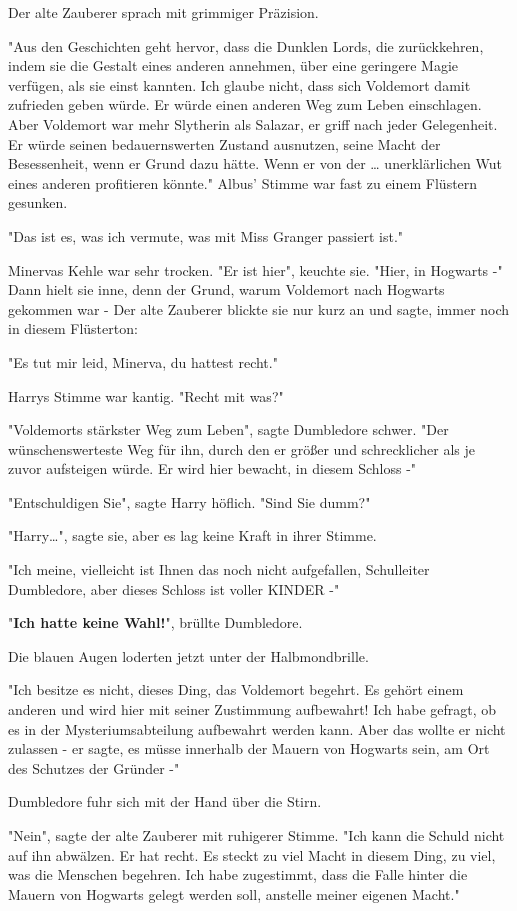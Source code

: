 {Der alte Zauberer sprach mit grimmiger Präzision.

"Aus den Geschichten geht hervor, dass die Dunklen Lords, die zurückkehren, indem sie die Gestalt eines anderen annehmen, über eine geringere Magie verfügen, als sie einst kannten. Ich glaube nicht, dass sich Voldemort damit zufrieden geben würde. Er würde einen anderen Weg zum Leben einschlagen. Aber Voldemort war mehr Slytherin als Salazar, er griff nach jeder Gelegenheit. Er würde seinen bedauernswerten Zustand ausnutzen, seine Macht der Besessenheit, wenn er Grund dazu hätte. Wenn er von der … unerklärlichen Wut eines anderen profitieren könnte." Albus' Stimme war fast zu einem Flüstern gesunken.

"Das ist es, was ich vermute, was mit Miss Granger passiert ist."

Minervas Kehle war sehr trocken. "Er ist hier", keuchte sie. "Hier, in Hogwarts -" Dann hielt sie inne, denn der Grund, warum Voldemort nach Hogwarts gekommen war - Der alte Zauberer blickte sie nur kurz an und sagte, immer noch in diesem Flüsterton:

"Es tut mir leid, Minerva, du hattest recht."

Harrys Stimme war kantig. "Recht mit was?"

"Voldemorts stärkster Weg zum Leben", sagte Dumbledore schwer. "Der wünschenswerteste Weg für ihn, durch den er größer und schrecklicher als je zuvor aufsteigen würde. Er wird hier bewacht, in diesem Schloss -"

"Entschuldigen Sie", sagte Harry höflich. "Sind Sie dumm?"

"Harry…", sagte sie, aber es lag keine Kraft in ihrer Stimme.

"Ich meine, vielleicht ist Ihnen das noch nicht aufgefallen, Schulleiter Dumbledore, aber dieses Schloss ist voller KINDER -"

"\textbf{Ich hatte keine Wahl!}", brüllte Dumbledore.

Die blauen Augen loderten jetzt unter der Halbmondbrille.

"Ich besitze es nicht, dieses Ding, das Voldemort begehrt. Es gehört einem anderen und wird hier mit seiner Zustimmung aufbewahrt! Ich habe gefragt, ob es in der Mysteriumsabteilung aufbewahrt werden kann. Aber das wollte er nicht zulassen - er sagte, es müsse innerhalb der Mauern von Hogwarts sein, am Ort des Schutzes der Gründer -"

Dumbledore fuhr sich mit der Hand über die Stirn.

"Nein", sagte der alte Zauberer mit ruhigerer Stimme. "Ich kann die Schuld nicht auf ihn abwälzen. Er hat recht. Es steckt zu viel Macht in diesem Ding, zu viel, was die Menschen begehren. Ich habe zugestimmt, dass die Falle hinter die Mauern von Hogwarts gelegt werden soll, anstelle meiner eigenen Macht."

}
